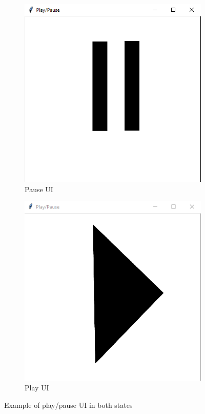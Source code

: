\documentclass[10pt,a4paper]{report}
\begin{document}
\begin{figure}
	\centering
	\begin{subfigure}[b]{0.4\textwidth}
		\centering
		\includegraphics[width=\textwidth]{PauseEx}
		\caption{Pause UI}
		\label{fig:pauseEx}
	\end{subfigure}
	\hfill
	\begin{subfigure}[b]{0.4\textwidth}
		\centering
		\includegraphics[width=\textwidth]{PlayEx}
		\caption{Play UI}
		\label{fig:playEx}
	\end{subfigure}
	\caption{Example of play/pause UI in both states}
	\label{fig:PPUI}
\end{figure}
\end{document}

